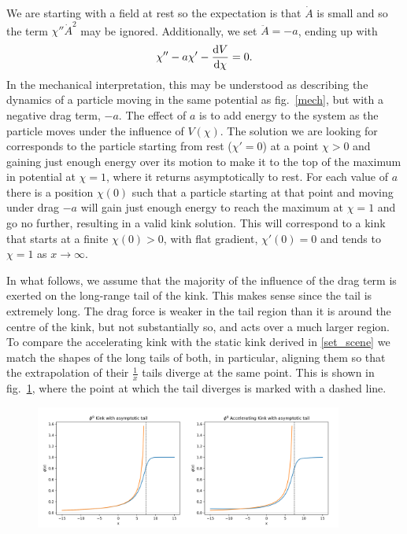 \documentclass[11pt, oneside]{article}  	%
\numberwithin{equation}{section}
\newcommand{\drv}{\ensuremath{\textup{d}}}
\begin{document}
 We are starting with a field at rest so the expectation is that $\dot{A}$ is small and so the term $\chi '' \dot{A}^2$ may be ignored. Additionally, we set $\ddot{A} = -a$, ending up with
 \begin{equation} \label{acc_kink}
 \chi'' - a\chi' - \frac{\drv V }{\drv \chi}=0.
 \end{equation}
In the mechanical interpretation, this may be understood as describing the dynamics of a particle moving in the same potential as fig.~\ref{mech}, but with a negative drag term, $-a$. The effect of $a$ is to add energy to the system as the particle moves under the influence of $V(\chi)$. The solution we are looking for corresponds to the particle starting from rest ($\chi' = 0$) at a point $\chi >0$ and gaining just enough energy over its motion to make it to the top of the maximum in potential at $\chi=1$, where it returns asymptotically to rest. For each value of $a$ there is a position $\chi(0)$ such that a particle starting at that point and moving under drag $-a$ will gain just enough energy to reach the maximum at $\chi=1$ and go no further, resulting in a valid kink solution. This will correspond to a kink that starts at a finite $\chi(0)>0$, with flat gradient, $\chi'(0)=0$ and tends to $\chi=1$ as $x \rightarrow \infty$.\par
In what follows, we assume that the majority of the influence of the drag term is exerted on the long-range tail of the kink. This makes sense since the tail is extremely long. The drag force is weaker in the tail region than it is around the centre of the kink, but not substantially so, and acts over a much larger region. To compare the accelerating kink with the static kink derived in \textsection \ref{set_scene} we match the shapes of the long tails of both, in particular, aligning them so that the extrapolation of their $\frac{1}{x}$ tails diverge at the same point. This is shown in fig.~\ref{tails}, where the point at which the tail diverges is marked with a dashed line.\par
\begin{figure}
\centering
\includegraphics[width=0.9\textwidth]{asym_tails.png}
 \label{tails}
\end{figure}
\end{document}

